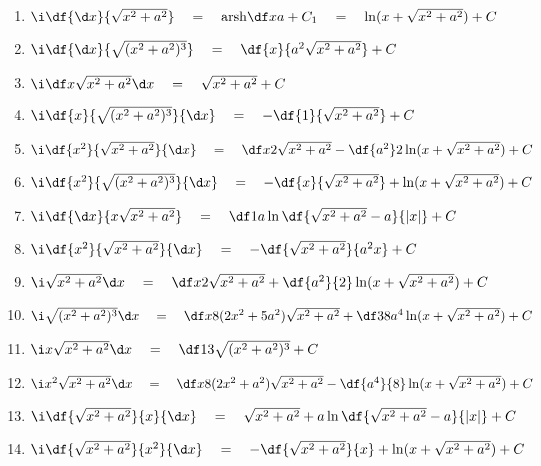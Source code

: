 \begin{enumerate}
\bigskip
{\bf （六）含有$\sqrt{x^2+a^2}\;(a>0)$的积分}\ps{$x=a\tan t$}
  \item $\i\df{{\d x}}{\sqrt{x^2+a^2}}\quad=\quad\mathrm{arsh}\df
  xa+C_1\quad=\quad\ln(x+\sqrt{x^2+a^2})+C$
  \item $\i\df{{\d x}}{\sqrt{(x^2+a^2)^3}}\quad=\quad\df{x}{a^2\sqrt{x^2+a^2}}+C$
  \item $\i\df x{\sqrt{x^2+a^2}}{\d x}\quad=\quad\sqrt{x^2+a^2}+C$
  \item $\i\df{x}{\sqrt{(x^2+a^2)^3}}{\d x}\quad=\quad-\df{1}{\sqrt{x^2+a^2}}+C$
  \item $\i\df{x^2}{\sqrt{x^2+a^2}}{\d x}\quad=\quad\df x2\sqrt{x^2+a^2}
  -\df{a^2}2\ln(x+\sqrt{x^2+a^2})+C$
  \item $\i\df{x^2}{\sqrt{(x^2+a^2)^3}}{\d x}\quad=\quad-\df{x}{\sqrt{x^2+a^2}}
	+\ln(x+\sqrt{x^2+a^2})+C$
  \item $\i\df{{\d x}}{x\sqrt{x^2+a^2}}\quad=\quad\df 1a\ln\df{\sqrt{x^2+a^2}-a}{|x|}+C$
  \item $\i\df{x^2}{\sqrt{x^2+a^2}}{\d x}\quad=\quad -\df{\sqrt{x^2+a^2}}{a^2x}+C$
  \item $\i\sqrt{x^2+a^2}{\d x}\quad=\quad\df
  x2\sqrt{x^2+a^2}+\df{a^2}{2}\ln(x+\sqrt{x^2+a^2})+C$
  \item $\i\sqrt{(x^2+a^2)^3}{\d x}\quad=\quad\df x8(2x^2+5a^2)\sqrt{x^2+a^2}
  +\df 38a^4\ln(x+\sqrt{x^2+a^2})+C$
  \item $\i x\sqrt{x^2+a^2}{\d x}\quad=\quad\df 13\sqrt{(x^2+a^2)^3}+C$
  \item $\i x^2\sqrt{x^2+a^2}{\d x}\quad=\quad\df
  x8(2x^2+a^2)\sqrt{x^2+a^2}-\df{a^4}{8}\ln(x+\sqrt{x^2+a^2})+C$
  \item
  $\i\df{\sqrt{x^2+a^2}}{x}{\d x}\quad=\quad\sqrt{x^2+a^2}+a\ln\df{\sqrt{x^2+a^2}-a}{|x|}+C$
  \item
  $\i\df{\sqrt{x^2+a^2}}{x^2}{\d x}\quad=\quad-\df{\sqrt{x^2+a^2}}{x}+\ln(x+\sqrt{x^2+a^2})+C$


\end{enumerate}

